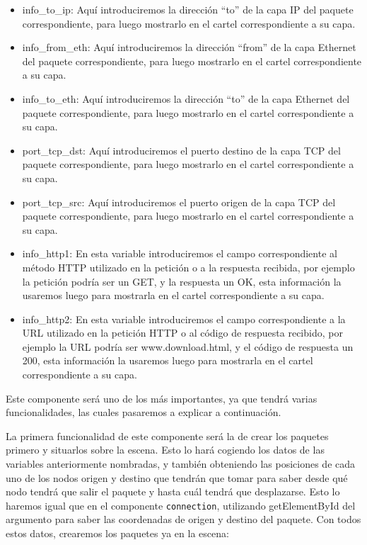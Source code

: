 \documentclass[a4paper, 12pt]{book}
\begin{document}
\begin{itemize}
    \item info\_to\_ip: Aquí introduciremos la dirección “to” de la capa IP del paquete correspondiente, para luego mostrarlo en el cartel correspondiente a su capa.
    
    \item info\_from\_eth: Aquí introduciremos la dirección “from” de la capa Ethernet del paquete correspondiente, para luego mostrarlo en el cartel correspondiente a su capa.
    
    \item info\_to\_eth: Aquí introduciremos la dirección “to” de la capa Ethernet del paquete correspondiente, para luego mostrarlo en el cartel correspondiente a su capa.
    
    \item port\_tcp\_dst: Aquí introduciremos el puerto destino de la capa TCP del paquete correspondiente, para luego mostrarlo en el cartel correspondiente a su capa.
    
    \item port\_tcp\_src: Aquí introduciremos el puerto origen de la capa TCP del paquete correspondiente, para luego mostrarlo en el cartel correspondiente a su capa.

    \item info\_http1: En esta variable introduciremos el campo correspondiente al método HTTP utilizado en la petición o a la respuesta recibida, por ejemplo la petición podría ser un GET, y la respuesta un OK, esta información la usaremos luego para mostrarla en el cartel correspondiente a su capa.
    
    \item info\_http2: En esta variable introduciremos el campo correspondiente a la URL utilizado en la petición HTTP o al código de respuesta recibido, por ejemplo la URL podría ser www.download.html, y el código de respuesta un 200, esta información la usaremos luego para mostrarla en el cartel correspondiente a su capa.

\end{itemize}

Este componente será uno de los más importantes, ya que tendrá varias funcionalidades, las cuales pasaremos a explicar a continuación.

La primera funcionalidad de este componente será la de crear los paquetes primero y situarlos sobre la escena. Esto lo hará cogiendo los datos de las variables anteriormente nombradas, y también obteniendo las posiciones de cada uno de los nodos origen y destino que tendrán que tomar para saber desde qué nodo tendrá que salir el paquete y hasta cuál tendrá que desplazarse. Esto lo haremos igual que en el componente \texttt{connection}, utilizando getElementById del argumento para saber las coordenadas de origen y destino del paquete.
Con todos estos datos, crearemos los paquetes ya en la escena:
\end{document}
